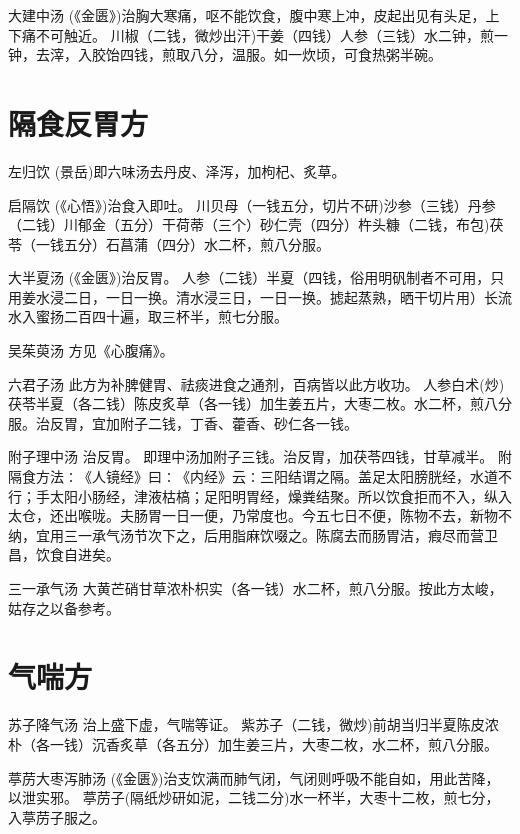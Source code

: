\documentclass[a4paper,12pt,UTF8,twoside]{ctexbook}
\begin{document}
    大建中汤
    (《金匮》)治胸大寒痛，呕不能饮食，腹中寒上冲，皮起出见有头足，上下痛不可触近。
    川椒（二钱，微炒出汗)干姜（四钱）人参（三钱）水二钟，煎一钟，去滓，入胶饴四钱，煎取八分，温服。如一炊顷，可食热粥半碗。   
    
    
    \chapter{隔食反胃方}	
    
    左归饮
    (景岳)即六味汤去丹皮、泽泻，加枸杞、炙草。
    
    启隔饮
    (《心悟》)治食入即吐。
    川贝母（一钱五分，切片不研)沙参（三钱）丹参（二钱）川郁金（五分）干荷蒂（三个）砂仁壳（四分）杵头糠（二钱，布包)茯苓（一钱五分）石菖蒲（四分）水二杯，煎八分服。
    
    大半夏汤
    (《金匮》)治反胃。
    人参（二钱）半夏（四钱，俗用明矾制者不可用，只用姜水浸二日，一日一换。清水浸三日，一日一换。摅起蒸熟，晒干切片用）长流水入蜜扬二百四十遍，取三杯半，煎七分服。
    
    吴茱萸汤
    方见《心腹痛》。
    
    六君子汤
    此方为补脾健胃、祛痰进食之通剂，百病皆以此方收功。
    人参白术(炒)茯苓半夏（各二钱）陈皮炙草（各一钱）加生姜五片，大枣二枚。水二杯，煎八分服。治反胃，宜加附子二钱，丁香、藿香、砂仁各一钱。
    
    附子理中汤
    治反胃。
    即理中汤加附子三钱。治反胃，加茯苓四钱，甘草减半。
    附隔食方法∶《人镜经》曰∶《内经》云∶三阳结谓之隔。盖足太阳膀胱经，水道不行；手太阳小肠经，津液枯槁；足阳明胃经，燥粪结聚。所以饮食拒而不入，纵入太仓，还出喉咙。夫肠胃一日一便，乃常度也。今五七日不便，陈物不去，新物不纳，宜用三一承气汤节次下之，后用脂麻饮啜之。陈腐去而肠胃洁，瘕尽而营卫昌，饮食自进矣。
    
    三一承气汤
    大黄芒硝甘草浓朴枳实（各一钱）水二杯，煎八分服。按此方太峻，姑存之以备参考。
    
	\chapter{气喘方}
	
	苏子降气汤
	治上盛下虚，气喘等证。
	紫苏子（二钱，微炒)前胡当归半夏陈皮浓朴（各一钱）沉香炙草（各五分）加生姜三片，大枣二枚，水二杯，煎八分服。
	
	葶苈大枣泻肺汤
	(《金匮》)治支饮满而肺气闭，气闭则呼吸不能自如，用此苦降，以泄实邪。
	葶苈子(隔纸炒研如泥，二钱二分)水一杯半，大枣十二枚，煎七分，入葶苈子服之。
	
\end{document}
